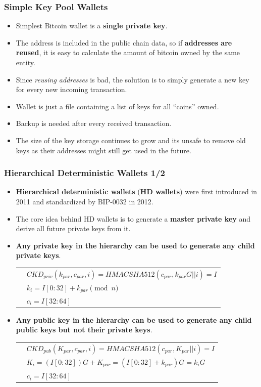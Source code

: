 \documentclass{beamer}
\begin{document}
\begin{frame}
  \frametitle{Simple Key Pool Wallets}
  \begin{itemize}
  \item Simplest Bitcoin wallet is a \textbf{single private key}.
  \item The address is included in the public chain data, so if
    \textbf{addresses are reused}, it is easy to calculate the amount of bitcoin
    owned by the same entity.
  \item Since \textit{reusing addresses} is bad, the solution is to simply
    generate a new key for every new incoming transaction.
  \item Wallet is just a file containing a list of keys for all ``coins'' owned.
  \item Backup is needed after every received transaction.
  \item The size of the key storage continues to grow and its unsafe to remove
    old keys as their addresses might still get used in the future.
  \end{itemize}
\end{frame}

\begin{frame}[fragile]
  \frametitle{Hierarchical Deterministic Wallets 1/2}
  \begin{itemize}
  \item \textbf{Hierarchical deterministic wallets} (\textbf{HD wallets}) were
    first introduced in 2011 and standardized by BIP-0032 in 2012.
  \item The core idea behind HD wallets is to generate a \textbf{master private
      key} and derive all future private keys from it.
  \item \textbf{Any private key in the hierarchy can be used to generate any child
      private keys}.
    \begin{tabular}{rl}
      &${\scriptstyle \mathit{CKD_{priv}}(k_{par}, c_{par}, i) = \mathit{HMACSHA512}(c_{par},
        k_{par}G||i) = I}$ \\
      &${\scriptstyle k_i = I[0:32] + k_{par} \pmod{n}}$ \\
      &${\scriptstyle c_i = I[32:64]}$ \\
    \end{tabular}
  \item \textbf{Any public key in the hierarchy can be used to generate any
      child public keys but not their private keys}.
    \begin{tabular}{rl}
      &${\scriptstyle \mathit{CKD_{pub}}(K_{par}, c_{par}, i) = \mathit{HMACSHA512}(c_{par},
        K_{par}||i) = I}$ \\
      &${\scriptstyle K_i = (I[0:32])G + K_{par} = (I[0:32] + k_{par})G = k_iG}$ \\
      &${\scriptstyle c_i = I[32:64]}$ \\
    \end{tabular}
  \end{itemize}
\end{frame}
\end{document}

